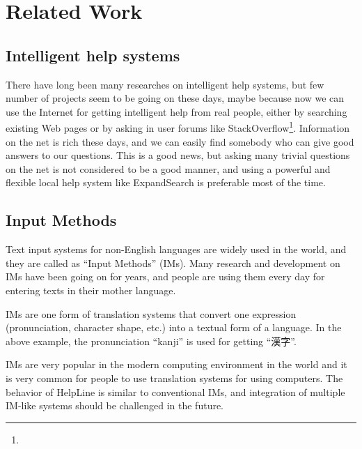\documentclass[manuscript,anonymous,review]{acmart}
\def\HL{\textsf{HelpLine}}
\def\ES{\textsf{ExpandSearch}}
\begin{document}
\section{Related Work}

\subsection{Intelligent help systems}

There have long been many researches on
intelligent help systems\cite{Delisle:2002:UIH:606412.606415},
but few number of projects seem to be going on these days,
maybe because now we can use the Internet for getting intelligent help from
real people,
either by searching existing Web pages or 
by asking in user forums like StackOverflow\footnote{
}.
Information on the net is rich these days, and we can easily
find somebody who can give good answers to our questions.
This is a good news, but 
asking many trivial questions on the net is not considered to be a
good manner, and
using a powerful and flexible local help system like {\ES} is
preferable most of the time.

\subsection{Input Methods}

Text input systems for non-English languages are widely used
in the world,
and they are called as ``Input Methods'' (IMs).
%
Many research and development on IMs have been going on for years, and
people are using them every day for entering texts in their mother language.

% 

IMs are one form of translation systems that convert one
expression (pronunciation, character shape, etc.)
into a textual form of a language.
In the above example, the pronunciation ``kanji''
is used for getting ``漢字''.

IMs are very popular in the modern computing environment in the world
and it is very common for people to 
use translation systems for using computers.
%
The behavior of {\HL} is similar to conventional IMs, and
integration of multiple IM-like systems should be challenged in the future.
\end{document}
